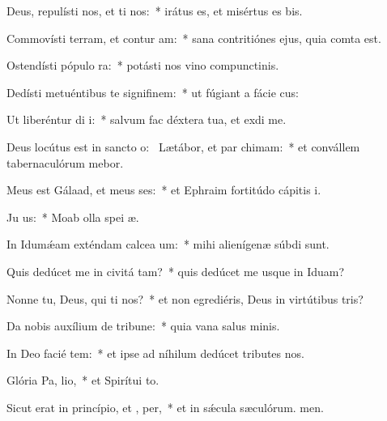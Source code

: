 \item Deus, repulísti nos, et ti nos:~* irátus es, et misértus es bis.
\item Commovísti terram, et contur am:~* sana contritiónes ejus, quia comta est.
\item Ostendísti pópulo  ra:~* potásti nos vino compunctinis.
\item Dedísti metuéntibus te signifinem:~* ut fúgiant a fácie cus:
\item Ut liberéntur di i:~* salvum fac déxtera tua, et exdi me.
\item Deus locútus est in sancto o:~\pscross{} Lætábor, et par chimam:~* et convállem tabernaculórum mebor.
\item Meus est Gálaad, et meus  ses:~* et Ephraim fortitúdo cápitis i.
\item Ju  us:~* Moab olla spei æ.
\item In Idumǽam exténdam calcea um:~* mihi alienígenæ súbdi sunt.
\item Quis dedúcet me in civitá tam?~* quis dedúcet me usque in Iduam?
\item Nonne tu, Deus, qui ti nos?~* et non egrediéris, Deus in virtútibus tris?
\item Da nobis auxílium de tribune:~* quia vana salus minis.
\item In Deo facié tem:~* et ipse ad níhilum dedúcet tributes nos.
\item Glória Pa,  lio,~* et Spirítui to.
\item Sicut erat in princípio, et ,  per,~* et in sǽcula sæculórum. men.
